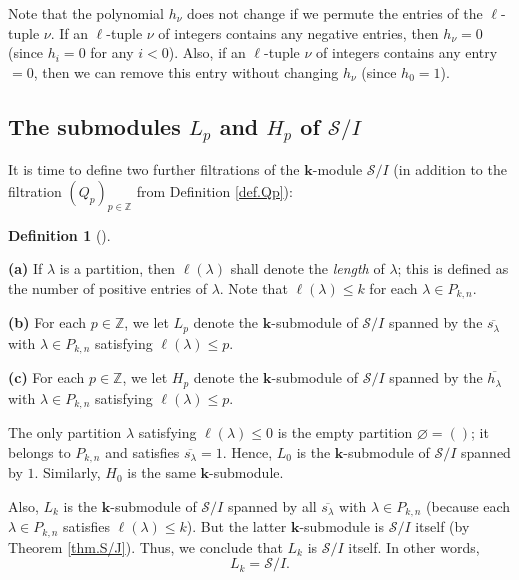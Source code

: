 \documentclass[numbers=enddot,12pt,final,onecolumn,notitlepage]{scrartcl}%
\theoremstyle{definition}
\newtheorem{defi}[theo]{Definition}
\newenvironment{definition}[1][]
{\begin{defi}[#1]\begin{leftbar}}
{\end{leftbar}\end{defi}}
\begin{document}
Note that the polynomial $h_{\nu}$ does not change if we permute the entries
of the $\ell$-tuple $\nu$. If an $\ell$-tuple $\nu$ of integers contains any
negative entries, then $h_{\nu}=0$ (since $h_{i}=0$ for any $i<0$). Also, if
an $\ell$-tuple $\nu$ of integers contains any entry $=0$, then we can remove
this entry without changing $h_{\nu}$ (since $h_{0}=1$).

\subsection{The submodules $L_{p}$ and $H_{p}$ of $\mathcal{S}/I$}

It is time to define two further filtrations of the $\mathbf{k}$-module
$\mathcal{S}/I$ (in addition to the filtration $\left(  Q_{p}\right)
_{p\in\mathbb{Z}}$ from Definition \ref{def.Qp}):

\begin{definition}
\label{def.LpHp}\textbf{(a)} If $\lambda$ is a partition, then $\ell\left(
\lambda\right)  $ shall denote the \textit{length} of $\lambda$; this is
defined as the number of positive entries of $\lambda$. Note that $\ell\left(
\lambda\right)  \leq k$ for each $\lambda\in P_{k,n}$.

\textbf{(b)} For each $p\in\mathbb{Z}$, we let $L_{p}$ denote the $\mathbf{k}%
$-submodule of $\mathcal{S}/I$ spanned by the $\overline{s_{\lambda}}$ with
$\lambda\in P_{k,n}$ satisfying $\ell\left(  \lambda\right)  \leq p$.

\textbf{(c)} For each $p\in\mathbb{Z}$, we let $H_{p}$ denote the $\mathbf{k}%
$-submodule of $\mathcal{S}/I$ spanned by the $\overline{h_{\lambda}}$ with
$\lambda\in P_{k,n}$ satisfying $\ell\left(  \lambda\right)  \leq p$.
\end{definition}

The only partition $\lambda$ satisfying $\ell\left(  \lambda\right)  \leq0$ is
the empty partition $\varnothing=\left(  {}\right)  $; it belongs to $P_{k,n}$
and satisfies $\overline{s_{\lambda}}=1$. Hence, $L_{0}$ is the $\mathbf{k}%
$-submodule of $\mathcal{S}/I$ spanned by $1$. Similarly, $H_{0}$ is the same
$\mathbf{k}$-submodule.

Also, $L_{k}$ is the $\mathbf{k}$-submodule of $\mathcal{S}/I$ spanned by all
$\overline{s_{\lambda}}$ with $\lambda\in P_{k,n}$ (because each $\lambda\in
P_{k,n}$ satisfies $\ell\left(  \lambda\right)  \leq k$). But the latter
$\mathbf{k}$-submodule is $\mathcal{S}/I$ itself (by Theorem \ref{thm.S/J}).
Thus, we conclude that $L_{k}$ is $\mathcal{S}/I$ itself. In other words,%
\[
L_{k}=\mathcal{S}/I.
\]
\end{document}
